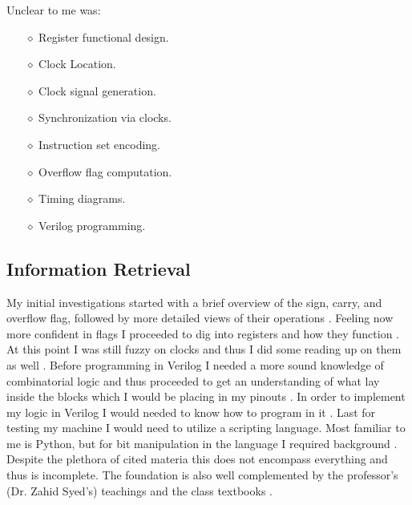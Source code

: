 \documentclass{article}
\begin{document}
\noindent
Unclear to me was: 
\begin{itemize}
    \item[\(\diamond\)] Register functional design.
    \item[\(\diamond\)] Clock Location.
    \item[\(\diamond\)] Clock signal generation.
    \item[\(\diamond\)] Synchronization via clocks.
    \item[\(\diamond\)] Instruction set encoding.
    \item[\(\diamond\)] Overflow flag computation.
    \item[\(\diamond\)] Timing diagrams.
    \item[\(\diamond\)] Verilog programming.
\end{itemize}

\subsection{Information Retrieval}
My initial investigations started with a brief overview of the sign, carry, and overflow flag, followed by more detailed views of their operations \cite{stack_binof, ebsmadl_ofs, stack_carry, wiki_negflag, wiki_ovfflag}.
Feeling now more confident in flags I proceeded to dig into registers and how they function \cite{neso_diff, neso_srlatch, neso_triggering}.
At this point I was still fuzzy on clocks and thus I did some reading up on them as well \cite{stack_ieclk, neso_clk, stack_oscii, wiki_clock}.
Before programming in Verilog I needed a more sound knowledge of combinatorial logic and thus proceeded to get an understanding of what lay inside the blocks which I would be placing in my pinouts \cite{et_binadd, et_binsub, et_combilog, et_digtcomp, et_demultiplex, et_multiplex, icacuk}.
In order to implement my logic in Verilog I would needed to know how to program in it \cite{coursera_fpga, rtd_fpga}. 
Last for testing my machine I would need to utilize a scripting language. 
Most familiar to me is Python, but for bit manipulation in the language I required background \cite{geeks_twos, stack_twos, pywiki_bit, stack_logitwos, geeks_ones}. 
Despite the plethora of cited materia this does not encompass everything and thus is incomplete. 
The foundation is also well complemented by the professor's (Dr. Zahid Syed's) teachings and the class textbooks \cite{Bryant, Hennessy}. 
\end{document}
